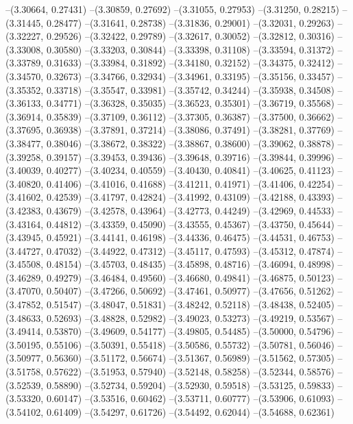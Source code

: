 --(3.30664, 0.27431)
--(3.30859, 0.27692)
--(3.31055, 0.27953)
--(3.31250, 0.28215)
--(3.31445, 0.28477)
--(3.31641, 0.28738)
--(3.31836, 0.29001)
--(3.32031, 0.29263)
--(3.32227, 0.29526)
--(3.32422, 0.29789)
--(3.32617, 0.30052)
--(3.32812, 0.30316)
--(3.33008, 0.30580)
--(3.33203, 0.30844)
--(3.33398, 0.31108)
--(3.33594, 0.31372)
--(3.33789, 0.31633)
--(3.33984, 0.31892)
--(3.34180, 0.32152)
--(3.34375, 0.32412)
--(3.34570, 0.32673)
--(3.34766, 0.32934)
--(3.34961, 0.33195)
--(3.35156, 0.33457)
--(3.35352, 0.33718)
--(3.35547, 0.33981)
--(3.35742, 0.34244)
--(3.35938, 0.34508)
--(3.36133, 0.34771)
--(3.36328, 0.35035)
--(3.36523, 0.35301)
--(3.36719, 0.35568)
--(3.36914, 0.35839)
--(3.37109, 0.36112)
--(3.37305, 0.36387)
--(3.37500, 0.36662)
--(3.37695, 0.36938)
--(3.37891, 0.37214)
--(3.38086, 0.37491)
--(3.38281, 0.37769)
--(3.38477, 0.38046)
--(3.38672, 0.38322)
--(3.38867, 0.38600)
--(3.39062, 0.38878)
--(3.39258, 0.39157)
--(3.39453, 0.39436)
--(3.39648, 0.39716)
--(3.39844, 0.39996)
--(3.40039, 0.40277)
--(3.40234, 0.40559)
--(3.40430, 0.40841)
--(3.40625, 0.41123)
--(3.40820, 0.41406)
--(3.41016, 0.41688)
--(3.41211, 0.41971)
--(3.41406, 0.42254)
--(3.41602, 0.42539)
--(3.41797, 0.42824)
--(3.41992, 0.43109)
--(3.42188, 0.43393)
--(3.42383, 0.43679)
--(3.42578, 0.43964)
--(3.42773, 0.44249)
--(3.42969, 0.44533)
--(3.43164, 0.44812)
--(3.43359, 0.45090)
--(3.43555, 0.45367)
--(3.43750, 0.45644)
--(3.43945, 0.45921)
--(3.44141, 0.46198)
--(3.44336, 0.46475)
--(3.44531, 0.46753)
--(3.44727, 0.47032)
--(3.44922, 0.47312)
--(3.45117, 0.47593)
--(3.45312, 0.47874)
--(3.45508, 0.48154)
--(3.45703, 0.48435)
--(3.45898, 0.48716)
--(3.46094, 0.48998)
--(3.46289, 0.49279)
--(3.46484, 0.49560)
--(3.46680, 0.49841)
--(3.46875, 0.50123)
--(3.47070, 0.50407)
--(3.47266, 0.50692)
--(3.47461, 0.50977)
--(3.47656, 0.51262)
--(3.47852, 0.51547)
--(3.48047, 0.51831)
--(3.48242, 0.52118)
--(3.48438, 0.52405)
--(3.48633, 0.52693)
--(3.48828, 0.52982)
--(3.49023, 0.53273)
--(3.49219, 0.53567)
--(3.49414, 0.53870)
--(3.49609, 0.54177)
--(3.49805, 0.54485)
--(3.50000, 0.54796)
--(3.50195, 0.55106)
--(3.50391, 0.55418)
--(3.50586, 0.55732)
--(3.50781, 0.56046)
--(3.50977, 0.56360)
--(3.51172, 0.56674)
--(3.51367, 0.56989)
--(3.51562, 0.57305)
--(3.51758, 0.57622)
--(3.51953, 0.57940)
--(3.52148, 0.58258)
--(3.52344, 0.58576)
--(3.52539, 0.58890)
--(3.52734, 0.59204)
--(3.52930, 0.59518)
--(3.53125, 0.59833)
--(3.53320, 0.60147)
--(3.53516, 0.60462)
--(3.53711, 0.60777)
--(3.53906, 0.61093)
--(3.54102, 0.61409)
--(3.54297, 0.61726)
--(3.54492, 0.62044)
--(3.54688, 0.62361)
